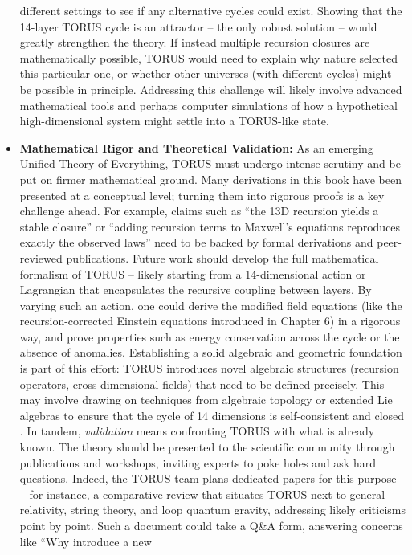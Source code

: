 \begin{itemize}
  different settings to see if any alternative cycles could exist.
  Showing that the 14-layer TORUS cycle is an attractor -- the only
  robust solution -- would greatly strengthen the theory. If instead
  multiple recursion closures are mathematically possible, TORUS would
  need to explain why nature selected this particular one, or whether
  other universes (with different cycles) might be possible in
  principle. Addressing this challenge will likely involve advanced
  mathematical tools and perhaps computer simulations of how a
  hypothetical high-dimensional system might settle into a TORUS-like
  state.
\item
  \textbf{Mathematical Rigor and Theoretical Validation:} As an emerging
  Unified Theory of Everything, TORUS must undergo intense scrutiny and
  be put on firmer mathematical ground. Many derivations in this book
  have been presented at a conceptual level; turning them into rigorous
  proofs is a key challenge ahead​. For example, claims such as ``the
  13D recursion yields a stable closure'' or ``adding recursion terms to
  Maxwell's equations reproduces exactly the observed laws'' need to be
  backed by formal derivations and peer-reviewed publications. Future
  work should develop the full mathematical formalism of TORUS -- likely
  starting from a 14-dimensional action or Lagrangian that encapsulates
  the recursive coupling between layers​. By varying such an action, one
  could derive the modified field equations (like the
  recursion-corrected Einstein equations introduced in Chapter 6) in a
  rigorous way, and prove properties such as energy conservation across
  the cycle or the absence of anomalies. Establishing a solid algebraic
  and geometric foundation is part of this effort: TORUS introduces
  novel algebraic structures (recursion operators, cross-dimensional
  fields) that need to be defined precisely. This may involve drawing on
  techniques from algebraic topology or extended Lie algebras to ensure
  that the cycle of 14 dimensions is self-consistent and closed​. In
  tandem, \emph{validation} means confronting TORUS with what is already
  known. The theory should be presented to the scientific community
  through publications and workshops, inviting experts to poke holes and
  ask hard questions. Indeed, the TORUS team plans dedicated papers for
  this purpose -- for instance, a comparative review that situates TORUS
  next to general relativity, string theory, and loop quantum gravity,
  addressing likely criticisms point by point​. Such a document could
  take a Q\&A form, answering concerns like ``Why introduce a new

\end{itemize}
